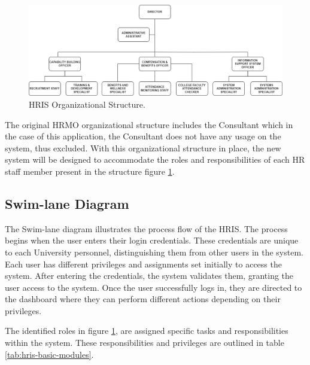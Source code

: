\begin{figure}[H]
    \centering
    \includegraphics[width=1\linewidth]{figures/images/doc/organizational-structure.png}
    \caption{HRIS Organizational Structure.}
    \label{fig:organizational-struct}
\end{figure}

The original HRMO organizational structure includes the Consultant which in the case of this application, the Consultant does not have any usage on the system, thus excluded. With this organizational structure in place, the new system will be designed to accommodate the roles and responsibilities of each HR staff member present in the structure figure \ref*{fig:organizational-struct}. 

    \subsection{Swim-lane Diagram}
    The Swim-lane diagram illustrates the process flow of the HRIS. The process begins when the user enters their login credentials. These credentials are unique to each University personnel, distinguishing them from other users in the system. Each user has different privileges and assignments set initially to access the system. After entering the credentials, the system validates them, granting the user access to the system. Once the user successfully logs in, they are directed to the dashboard where they can perform different actions depending on their privileges.

    The identified roles in figure \ref*{fig:organizational-struct}, are assigned specific tasks and responsibilities within the system. These responsibilities and privileges are outlined in table \ref*{tab:hris-basic-modules}. 


